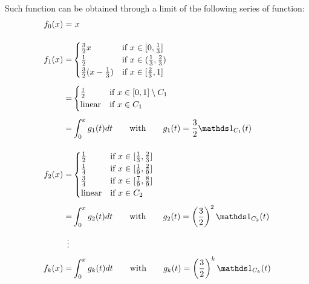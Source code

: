 Such function can be obtained through a limit of the following series of function:
\begin{align*}
f_0(x) = & \ x\\[1 em]
f_1(x) = &
\begin{cases}
{\tfrac 3 2} x & \text{if } x \in [0, \tfrac 1 3] \\
{\tfrac 1 2} & \text{if } x \in (\tfrac 1 3, \tfrac 2 3) \\
{\tfrac 3 2} (x - \tfrac 1 3) & \text{if } x \in [\tfrac 2 3, 1] \\
\end{cases}\\[0.5 em]
= & \begin{cases}
\frac 1 2 & \text{if } x \in [0, 1] \setminus C_1 \\
\text{linear} & \text{if } x \in C_1
\end{cases} \\[0.5 em]
= & \int_0^x g_1(t) dt \qquad \text{with} \qquad g_1(t) = \frac 3 2 \Ind_{C_1}(t)\\[1 em]
f_2(x) = &
\begin{cases}
\frac 1 2 & \text{if } x \in [\frac 1 3, \frac 2 3] \\
\frac 1 4 & \text{if } x \in [\frac 1 9, \frac 2 9]  \\
\frac 3 4 & \text{if } x \in [\frac 7 9, \frac 8 9]  \\
\text{linear} & \text{if } x \in C_2
\end{cases} \\[0.3 em]
= & \int_0^x g_2(t) dt \qquad \text{with} \qquad g_2(t) = \left( \frac 3 2 \right)^2 \Ind_{C_2}(t)\\[0.5 em]
\vdots \ &\\[0.3 em]
f_k(x) = & \int_0^x g_k(t) dt \qquad \text{with} \qquad g_k(t) = \left( \frac 3 2 \right)^k \Ind_{C_k}(t)
\end{align*}


